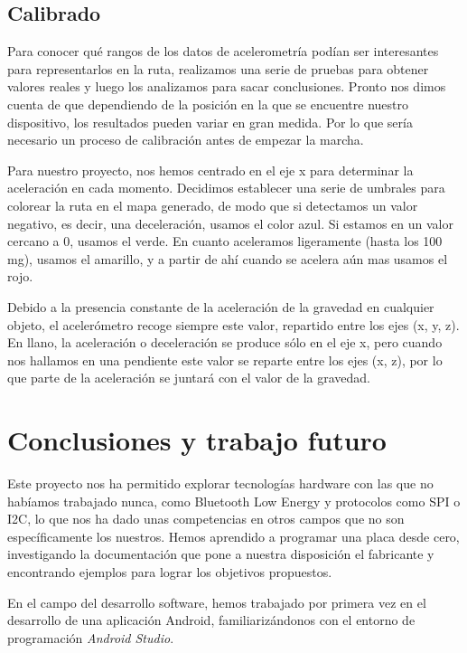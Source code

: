 
\section{Calibrado}

Para conocer qué rangos de los datos de acelerometría podían ser interesantes para representarlos en la ruta, realizamos una serie de pruebas para obtener valores reales y luego los analizamos para sacar conclusiones. Pronto nos dimos cuenta de que dependiendo de la posición en la que se encuentre nuestro dispositivo, los resultados pueden variar en gran medida. Por lo que sería necesario un proceso de calibración antes de empezar la marcha.

Para nuestro proyecto, nos hemos centrado en el eje x para determinar la aceleración en cada momento. Decidimos establecer una serie de umbrales para colorear la ruta en el mapa generado, de modo que si detectamos un valor negativo, es decir, una deceleración, usamos el color azul. Si estamos en un valor cercano a 0, usamos el verde. En cuanto aceleramos ligeramente (hasta los 100 mg), usamos el amarillo, y a partir de ahí cuando se acelera aún mas usamos el rojo.

Debido a la presencia constante de la aceleración de la gravedad en cualquier objeto, el acelerómetro recoge siempre este valor, repartido entre los ejes (x, y, z). En llano, la aceleración o deceleración se produce sólo en el eje x, pero cuando nos hallamos en una pendiente este valor se reparte entre los ejes (x, z), por lo que parte de la aceleración se juntará con el valor de la gravedad.

\cleardoublepage

\chapter{Conclusiones y trabajo futuro}
\label{makereference8}

Este proyecto nos ha permitido explorar tecnologías hardware con las que no habíamos trabajado nunca, como Bluetooth Low Energy y protocolos como SPI o I2C, lo que nos ha dado unas competencias en otros campos que no son específicamente los nuestros. Hemos aprendido a programar una placa desde cero, investigando la documentación que pone a nuestra disposición el fabricante y encontrando ejemplos para lograr los objetivos propuestos.

En el campo del desarrollo software, hemos trabajado por primera vez en el desarrollo de una aplicación Android, familiarizándonos con el entorno de programación \textit{Android Studio}.

